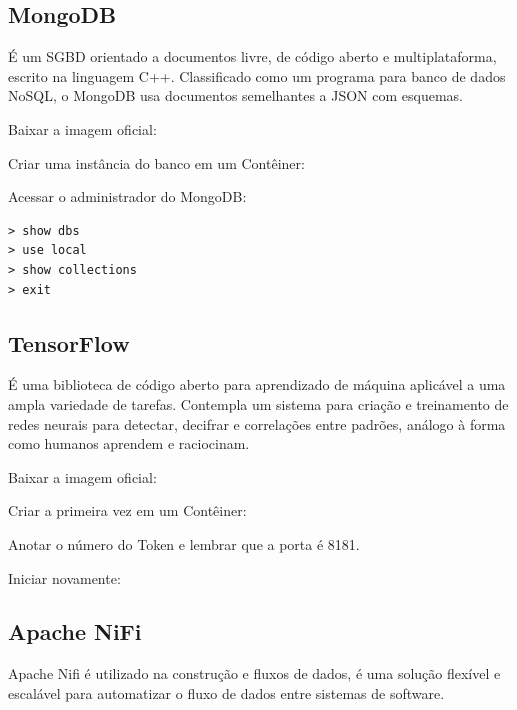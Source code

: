\documentclass[a4paper,11pt]{article}
\begin{document}
\subsection{MongoDB}
É um SGBD orientado a documentos livre, de código aberto e multiplataforma, escrito na linguagem C++. Classificado como um programa para banco de dados NoSQL, o MongoDB usa documentos semelhantes a JSON com esquemas. 

Baixar a imagem oficial: \\

Criar uma instância do banco em um Contêiner: \\

Acessar o administrador do MongoDB: \\
\begin{lstlisting}[]
> show dbs
> use local
> show collections
> exit
\end{lstlisting}

\subsection{TensorFlow}
É uma biblioteca de código aberto para aprendizado de máquina aplicável a uma ampla variedade de tarefas. Contempla um sistema para criação e treinamento de redes neurais para detectar, decifrar e correlações entre padrões, análogo à forma como humanos aprendem e raciocinam. 

Baixar a imagem oficial: \\

Criar a primeira vez em um Contêiner: \\

Anotar o número do Token e lembrar que a porta é 8181. 

Iniciar novamente: \\

\subsection{Apache NiFi}
Apache Nifi é utilizado na construção e fluxos de dados, é uma solução flexível e escalável para automatizar o fluxo de dados entre sistemas de software. 
\end{document}
